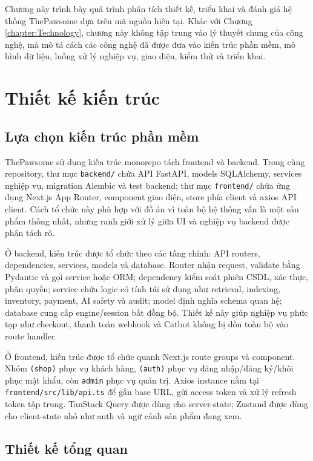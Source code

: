 \documentclass[../DoAn.tex]{subfiles}
\begin{document}
Chương này trình bày quá trình phân tích thiết kế, triển khai và đánh giá hệ thống ThePawsome dựa trên mã nguồn hiện tại. Khác với Chương \ref{chapter:Technology}, chương này không tập trung vào lý thuyết chung của công nghệ, mà mô tả cách các công nghệ đã được đưa vào kiến trúc phần mềm, mô hình dữ liệu, luồng xử lý nghiệp vụ, giao diện, kiểm thử và triển khai.

\section{Thiết kế kiến trúc}
\label{section:4.1}

\subsection{Lựa chọn kiến trúc phần mềm}
\label{subsection:4.1.1}

ThePawsome sử dụng kiến trúc monorepo tách frontend và backend. Trong cùng repository, thư mục \texttt{backend/} chứa API FastAPI, models SQLAlchemy, services nghiệp vụ, migration Alembic và test backend; thư mục \texttt{frontend/} chứa ứng dụng Next.js App Router, component giao diện, store phía client và axios API client. Cách tổ chức này phù hợp với đồ án vì toàn bộ hệ thống vẫn là một sản phẩm thống nhất, nhưng ranh giới xử lý giữa UI và nghiệp vụ backend được phân tách rõ.

Ở backend, kiến trúc được tổ chức theo các tầng chính: API routers, dependencies, services, models và database. Router nhận request, validate bằng Pydantic và gọi service hoặc ORM; dependency kiểm soát phiên CSDL, xác thực, phân quyền; service chứa logic có tính tái sử dụng như retrieval, indexing, inventory, payment, AI safety và audit; model định nghĩa schema quan hệ; database cung cấp engine/session bất đồng bộ. Thiết kế này giúp nghiệp vụ phức tạp như checkout, thanh toán webhook và Catbot không bị dồn toàn bộ vào route handler.

Ở frontend, kiến trúc được tổ chức quanh Next.js route groups và component. Nhóm \texttt{(shop)} phục vụ khách hàng, \texttt{(auth)} phục vụ đăng nhập/đăng ký/khôi phục mật khẩu, còn \texttt{admin} phục vụ quản trị. Axios instance nằm tại \texttt{frontend/src/lib/api.ts} để gắn base URL, gửi access token và xử lý refresh token tập trung. TanStack Query được dùng cho server-state; Zustand được dùng cho client-state nhỏ như auth và ngữ cảnh sản phẩm đang xem.

\subsection{Thiết kế tổng quan}
\label{subsection:4.1.2}
\end{document}
